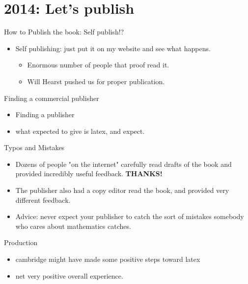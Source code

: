 \documentclass[draft]{beamer}
\begin{document}
\section{2014: Let's publish}

\begin{frame}{How to Publish the book:  Self publish!?}
  \begin{itemize}
    \item Self publishing: just put it on my website and see what happens.
          \begin{itemize}
            \item Enormous number of people that proof read it.
            \item Will Hearst pushed us for proper publication.
          \end{itemize}
  \end{itemize}
\end{frame}

\begin{frame}{Finding a commercial publisher}
  \begin{itemize}
    \item   Finding a publisher
    \item what expected to give is latex, and expect.
  \end{itemize}
\end{frame}


\begin{frame}{Typos and Mistakes}
  \begin{itemize}
    \item Dozens of people "on the internet" carefully read drafts of
          the book and provided incredibly useful feedback.  \textbf{THANKS!}
    \item The publisher also had a copy editor read the book,
          and provided very different feedback.
    \item Advice: never expect your publisher to catch the sort of
          mistakes somebody who cares about mathematics catches.
  \end{itemize}
\end{frame}


\begin{frame}{Production}

  \begin{itemize}
    \item cambridge might have made some positive steps toward latex
    \item net very positive overall experience.
  \end{itemize}

\end{frame}
\end{document}
